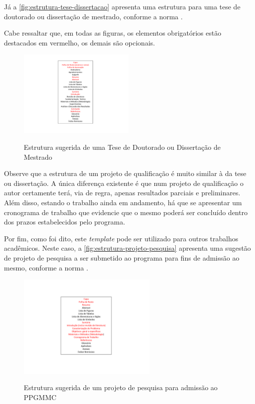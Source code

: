 \begin{apendicesenv}
Já a \autoref{fig:estrutura-tese-dissertacao} apresenta uma estrutura para uma
tese de doutorado ou dissertação de mestrado, conforme a norma
.

Cabe ressaltar que, em todas as figuras, os elementos obrigatórios estão
destacados em vermelho, os demais são opcionais.

\begin{figure}[!htb]
    \centering
    \caption{Estrutura sugerida de uma Tese de Doutorado ou Dissertação de Mestrado}
    \includegraphics[width=0.5\textwidth]{./4....figures/estrutura-tese-dissertacao}
    \label{fig:estrutura-tese-dissertacao}
\end{figure}

Observe que a estrutura de um projeto de qualificação é muito similar à da tese
ou dissertação. A única diferença existente é que num projeto de qualificação o
autor certamente terá, via de regra, apenas resultados parciais e preliminares.
Além disso, estando o trabalho ainda em andamento, há que se apresentar um
cronograma de trabalho que evidencie que o mesmo poderá ser concluído dentro dos
prazos estabelecidos pelo programa.

Por fim, como foi dito, este  \emph{template} pode ser utilizado para outros
trabalhos acadêmicos. Neste caso, a \autoref{fig:estrutura-projeto-pesquisa}
apresenta uma sugestão de projeto de pesquisa a ser submetido ao programa para
fins de admissão ao mesmo, conforme a norma .

\begin{figure}[!htb]
    \centering
    \caption{Estrutura sugerida de um projeto de pesquisa para admissão ao PPGMMC}
    \includegraphics[width=0.6\textwidth]{./4....figures/estrutura-projeto-pesquisa}
    \label{fig:estrutura-projeto-pesquisa}
\end{figure}


\end{apendicesenv}
